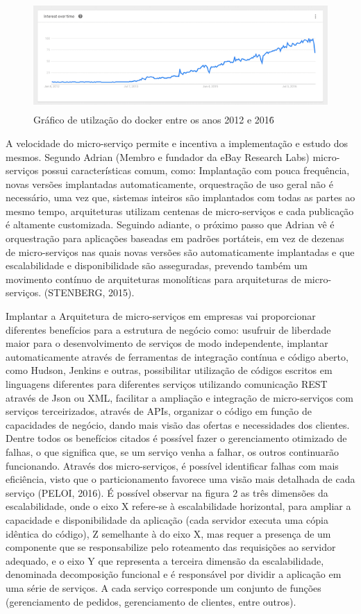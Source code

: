 \begin{figure}[h]
\centering
\includegraphics[height=4.2cm]{imagens/docker}
\caption{Gráfico de utilzação do docker entre os anos 2012 e 2016\.}
\label{fig:exemplo}
\end{figure}

A velocidade do micro-serviço permite e incentiva a implementação e estudo dos mesmos. Segundo Adrian (Membro e fundador da eBay Research Labs)  micro-serviços possui características comum, como: Implantação com pouca frequência, novas versões implantadas automaticamente, orquestração de uso geral não é necessário, uma vez que, sistemas inteiros são implantados com todas as partes ao mesmo tempo, arquiteturas utilizam centenas de micro-serviços e cada publicação é altamente customizada.
Seguindo adiante, o próximo passo que Adrian vê é orquestração para aplicações baseadas em padrões portáteis, em vez de dezenas de micro-serviços nas quais novas versões são automaticamente implantadas e que escalabilidade e disponibilidade são asseguradas, prevendo também um movimento contínuo de arquiteturas monolíticas para arquiteturas de micro-serviços. (STENBERG, 2015).

Implantar a Arquitetura de micro-serviços em empresas vai proporcionar diferentes benefícios para a estrutura de negócio como: usufruir de liberdade maior para o desenvolvimento de serviços de modo independente, implantar automaticamente através de ferramentas de integração contínua e código aberto, como Hudson, Jenkins e outras, possibilitar utilização de códigos escritos em linguagens diferentes para diferentes serviços utilizando comunicação REST através de Json ou XML, facilitar a ampliação e integração de micro-serviços com serviços terceirizados, através de APIs, organizar o código em função de capacidades de negócio, dando mais visão das ofertas e necessidades dos clientes. Dentre todos os benefícios citados é possível fazer o gerenciamento otimizado de falhas, o que significa que, se um serviço venha a falhar, os outros continuarão funcionando. Através dos micro-serviços, é possível identificar falhas com mais eficiência, visto que o particionamento favorece uma visão mais detalhada de cada serviço (PELOI, 2016). É possível observar na figura 2 as três dimensões da escalabilidade, onde o eixo X refere-se à escalabilidade horizontal, para ampliar a capacidade e disponibilidade da aplicação (cada servidor executa uma cópia idêntica do código), Z semelhante à do eixo X,  mas requer a presença de um componente que se responsabilize pelo roteamento das requisições ao servidor adequado, e o eixo Y que representa a terceira dimensão da escalabilidade, denominada decomposição funcional e é responsável por dividir a aplicação em uma série de serviços. A cada serviço corresponde um conjunto de funções (gerenciamento de pedidos, gerenciamento de clientes, entre outros).

